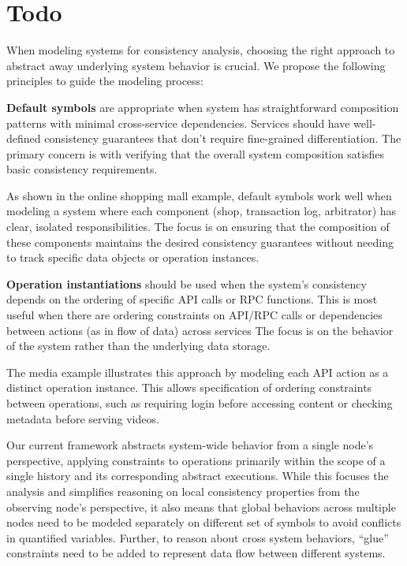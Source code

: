 {
  \color{blue}
  \section{Todo}


  When modeling systems for consistency analysis, choosing the right
  approach to abstract away underlying system behavior is crucial.
  We propose the following principles to guide the modeling process:

  \textbf{Default symbols} are appropriate when system has straightforward
  composition patterns with minimal cross-service dependencies.
  Services should have well-defined consistency guarantees that don't
  require fine-grained differentiation.
  The primary concern is with verifying that the overall system
  composition satisfies basic consistency requirements.

  As shown in the online shopping mall example, default symbols work well when
  modeling a system where each component (shop, transaction log,
  arbitrator) has clear, isolated responsibilities. The focus is on
  ensuring that the composition of these components maintains the
  desired consistency guarantees without needing to track specific data
  objects or operation instances.

  \textbf{Operation instantiations} should be used
  when the system's consistency depends on the ordering of specific API
  calls or RPC functions.
  This is most useful when there are ordering constraints on API/RPC
  calls or dependencies between actions (as in flow of data) across services
  The focus is on the behavior of the system rather than the underlying
  data storage.

  The media example illustrates this approach by modeling each API
  action as a distinct operation instance. This allows specification of
  ordering constraints between operations,
  such as requiring login before accessing content or checking metadata
  before serving videos.


  Our current framework abstracts system-wide behavior from a single
  node's perspective, applying constraints to operations primarily within the
  scope of a single history and its corresponding abstract
  executions. While this
  focuses the analysis and simplifies reasoning on local consistency properties
  from the observing node's perspective, it also means that global behaviors
  across multiple nodes need to be modeled separately on different
  set of symbols
  to avoid conflicts in quantified variables. Further, to reason about cross
  system behaviors, ``glue'' constraints need to be added to represent data flow
  between different systems.

}
